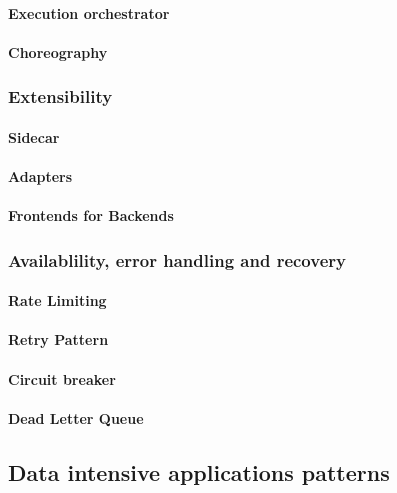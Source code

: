 \documentclass[a4paper, 11pt]{book}
\begin{document}
    \paragraph{Execution orchestrator}
    \paragraph{Choreography}
    
    \subsubsection{Extensibility}

    \paragraph{Sidecar}

    \paragraph{Adapters}

    \paragraph{Frontends for Backends}

    \subsubsection{Availablility, error handling and recovery}

    \paragraph{Rate Limiting}

    \paragraph{Retry Pattern}

    \paragraph{Circuit breaker}

    \paragraph{Dead Letter Queue}

    \subsection{Data intensive applications patterns}
\end{document}
